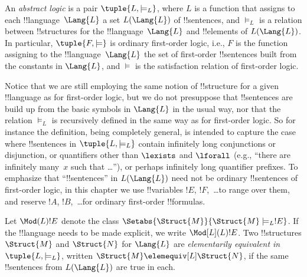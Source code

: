 \documentclass[../../../include/open-logic-section]{subfiles}
\begin{document}

\begin{defn}
An \emph{abstract logic} is a pair $\tuple{L, \models_L}$, where $L$
is a function that assigns to each !!{language}~$\Lang{L}$ a set
$L(\Lang{L})$ of !!{sentence}s, and $\models_L$ is a relation between
!!{structure}s for the !!{language}~$\Lang{L}$ and !!{element}s of
$L(\Lang{L})$. In particular, $\tuple{F, \models}$ is ordinary
first-order logic, i.e., $F$ is the function assigning to the
!!{language}~$\Lang{L}$ the set of first-order !!{sentence}s built from
the constants in $\Lang{L}$, and $\models$ is the satisfaction relation
of first-order logic.
\end{defn}

Notice that we are still employing the same notion of !!{structure}
for a given !!{language} as for first-order logic, but we do not
presuppose that !!{sentence}s are build up from the basic symbols in
$\Lang{L}$ in the usual way, nor that the relation $\models_L$ is
recursively defined in the same way as for first-order logic. So for
instance the definition, being completely general, is intended to
capture the case where !!{sentence}s in $\tuple{L,\models_L}$ contain
infinitely long conjunctions or disjunction, or quantifiers other than
$\lexists$ and $\lforall$ (e.g., ``there are infinitely many~$x$ such
that \dots''), or perhaps infinitely long quantifier prefixes. To
emphasize that ``!!{sentence}s'' in $L(\Lang{L})$ need not be ordinary
!!{sentence}s of first-order logic, in this chapter we use !!{variable}s $!E$,
$!F$,~\dots to range over them, and reserve $!A$, $!B$,~\dots for
ordinary first-order !!{formula}s.

\begin{defn}
Let $\Mod(L){!E}$ denote the class $\Setabs{\Struct{M}}{\Struct{M}
  \models_L !E}$. If the !!{language} needs to be made explicit, we
write $\Mod[L](L){!E}$. Two !!{structure}s $\Struct{M}$ and
$\Struct{N}$ for $\Lang{L}$ are \emph{elementarily equivalent in}
$\tuple{L, \models_L}$, written $\Struct{M} \elemequiv[L] \Struct{N}$, if
the same !!{sentence}s from $L(\Lang{L})$ are true in each.
\end{defn}
\end{document}
